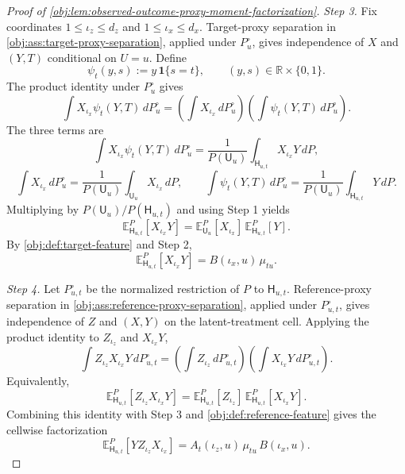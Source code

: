 \begin{proof}[Proof of \cref{obj:lem:observed-outcome-proxy-moment-factorization}]
\emph{Step 3.} Fix coordinates \(1\le \iota_z\le d_z\) and \(1\le \iota_x\le d_x\).  Target-proxy separation in \cref{obj:ass:target-proxy-separation}, applied under \(P_u^\circ\), gives independence of \(X\) and \((Y,T)\) conditional on \(U=u\).  Define
\[
\psi_t(y,s):=y\,\mathbf 1\{s=t\},
\qquad (y,s)\in\mathbb R\times\{0,1\}.
\]
The product identity under \(P_u^\circ\) gives
\[
\int X_{\iota_x}\psi_t(Y,T)\,dP_u^\circ
=
\left(\int X_{\iota_x}\,dP_u^\circ\right)
\left(\int \psi_t(Y,T)\,dP_u^\circ\right).
\]
The three terms are
\[
\int X_{\iota_x}\psi_t(Y,T)\,dP_u^\circ
=
\frac{1}{P(\mathsf U_u)}
\int_{\mathsf H_{u,t}}X_{\iota_x}Y\,dP,
\]
\[
\int X_{\iota_x}\,dP_u^\circ
=
\frac{1}{P(\mathsf U_u)}
\int_{\mathsf U_u}X_{\iota_x}\,dP,
\qquad
\int \psi_t(Y,T)\,dP_u^\circ
=
\frac{1}{P(\mathsf U_u)}
\int_{\mathsf H_{u,t}}Y\,dP .
\]
Multiplying by \(P(\mathsf U_u)/P(\mathsf H_{u,t})\) and using Step 1 yields
\[
\mathbb E_{\mathsf H_{u,t}}^{P}[X_{\iota_x}Y]
=
\mathbb E_{\mathsf U_u}^{P}[X_{\iota_x}]\,
\mathbb E_{\mathsf H_{u,t}}^{P}[Y].
\]
By \cref{obj:def:target-feature} and Step 2,
\[
\mathbb E_{\mathsf H_{u,t}}^{P}[X_{\iota_x}Y]
=
B(\iota_x,u)\,\mu_{tu}.
\]

\emph{Step 4.} Let \(P_{u,t}^\circ\) be the normalized restriction of \(P\) to \(\mathsf H_{u,t}\).  Reference-proxy separation in \cref{obj:ass:reference-proxy-separation}, applied under \(P_{u,t}^\circ\), gives independence of \(Z\) and \((X,Y)\) on the latent-treatment cell.  Applying the product identity to \(Z_{\iota_z}\) and \(X_{\iota_x}Y\),
\[
\int Z_{\iota_z}X_{\iota_x}Y\,dP_{u,t}^\circ
=
\left(\int Z_{\iota_z}\,dP_{u,t}^\circ\right)
\left(\int X_{\iota_x}Y\,dP_{u,t}^\circ\right).
\]
Equivalently,
\[
\mathbb E_{\mathsf H_{u,t}}^{P}[Z_{\iota_z}X_{\iota_x}Y]
=
\mathbb E_{\mathsf H_{u,t}}^{P}[Z_{\iota_z}]\,
\mathbb E_{\mathsf H_{u,t}}^{P}[X_{\iota_x}Y].
\]
Combining this identity with Step 3 and \cref{obj:def:reference-feature} gives the cellwise factorization
\[
\mathbb E_{\mathsf H_{u,t}}^{P}[YZ_{\iota_z}X_{\iota_x}]
=
A_t(\iota_z,u)\,\mu_{tu}\,B(\iota_x,u).
\]


\end{proof}
